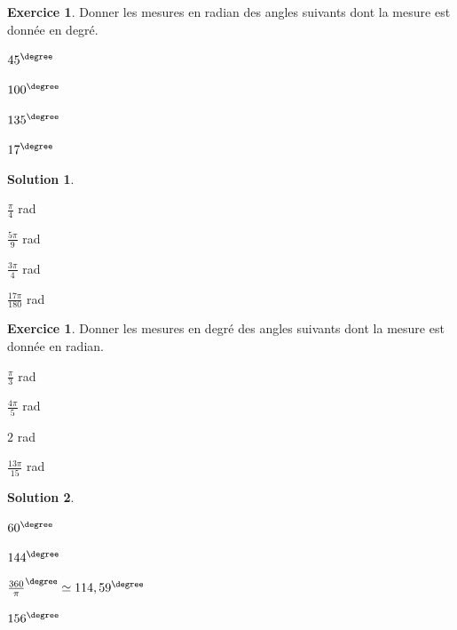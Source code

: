 \documentclass[a4paper,fontsize=13pt]{scrreprt}
\theoremstyle{plain}
\theoremstyle{definition}
\newtheorem{exo}[subsection]{Exercice}
\newtheorem*{solu}{Solution}
\begin{document}
\begin{exo}
Donner les mesures en radian des angles suivants dont la mesure est donnée en degré.
\begin{enumerate}
\begin{multicols}{2}
\item ${45}^{\degree}$
\item ${100}^{\degree}$
\item ${135}^{\degree}$
\item ${17}^{\degree}$
\end{multicols}
\end{enumerate}
\end{exo}
\newpage
\begin{solu}
~\\
\begin{enumerate}
\begin{multicols}{2}
\item $\frac{\pi}{4}$ rad
\item $\frac{5\pi}{9}$ rad
\item $\frac{3\pi}{4}$ rad
\item $\frac{17\pi}{180}$ rad
\end{multicols}
\end{enumerate}
\end{solu}

\begin{exo}
Donner les mesures en degré des angles suivants dont la mesure est donnée en radian.
\begin{enumerate}
\begin{multicols}{2}
\item $\frac{\pi}{3}$ rad
\item $\frac{4\pi}{5}$ rad
\item $2$ rad
\item $\frac{13\pi}{15}$ rad
\end{multicols}
\end{enumerate}
\end{exo}

\begin{solu}
~\\
\begin{enumerate}
\begin{multicols}{2}
\item ${60}^{\degree}$
\item ${144}^{\degree}$
\item ${\frac{360}{\pi}}^{\degree} \simeq {114,59}^{\degree}$
\item ${156}^{\degree}$
\end{multicols}
\end{enumerate}
\end{solu}
\end{document}

